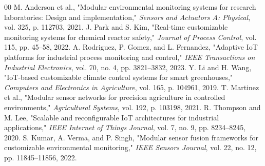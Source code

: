 \documentclass[journal,onecolumn]{IEEEtran}
\begin{document}
\begin{thebibliography}{00}
 M. Anderson et al., "Modular environmental monitoring systems for research laboratories: Design and implementation," \textit{Sensors and Actuators A: Physical}, vol. 325, p. 112703, 2021.
 J. Park and S. Kim, "Real-time customizable monitoring systems for chemical reactor safety," \textit{Journal of Process Control}, vol. 115, pp. 45–58, 2022.
 A. Rodriguez, P. Gomez, and L. Fernandez, "Adaptive IoT platforms for industrial process monitoring and control," \textit{IEEE Transactions on Industrial Electronics}, vol. 70, no. 4, pp. 3821–3832, 2023.
 Y. Li and H. Wang, "IoT-based customizable climate control systems for smart greenhouses," \textit{Computers and Electronics in Agriculture}, vol. 165, p. 104961, 2019.
 T. Martinez et al., "Modular sensor networks for precision agriculture in controlled environments," \textit{Agricultural Systems}, vol. 192, p. 103198, 2021.
 R. Thompson and M. Lee, "Scalable and reconfigurable IoT architectures for industrial applications," \textit{IEEE Internet of Things Journal}, vol. 7, no. 9, pp. 8234–8245, 2020.
 S. Kumar, A. Verma, and P. Singh, "Modular sensor fusion frameworks for customizable environmental monitoring," \textit{IEEE Sensors Journal}, vol. 22, no. 12, pp. 11845–11856, 2022.
\end{thebibliography}
\end{document}

